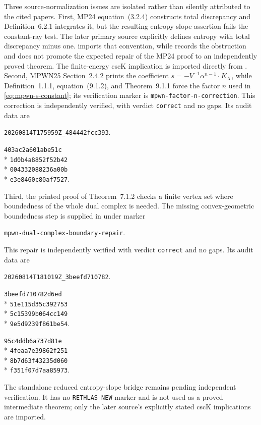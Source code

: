 Three source-normalization issues are isolated rather than silently
attributed to the cited papers.  First, MP24 equation~(3.2.4) constructs
total discrepancy and Definition~6.2.1 integrates it, but the resulting
entropy-slope assertion fails the constant-ray test.  The later primary
source \cite[Definition~2.4.1]{MPWN25} explicitly defines entropy with total
discrepancy minus one.   imports that convention,
while  records the obstruction and does not promote the
expected repair of the MP24 proof to an independently proved theorem.  The
finite-energy cscK implication is imported directly from
\cite[Theorem~2.4.3]{MPWN25}.  Second, MPWN25
Section~2.4.2 prints the coefficient
\(s=-V^{-1}\alpha^{n-1}\cdot K_X\), while Definition~1.1.1, equation~(9.1.2),
and Theorem~9.1.1 force the factor \(n\) used in
\eqref{eq:mpwn-s-constant}; its verification marker is
\texttt{mpwn-factor-n-correction}.  This correction is independently
verified, with verdict \texttt{correct} and no gaps.  Its audit data are
\begin{description}[style=nextline,leftmargin=1.5em,labelindent=0pt]
\item[Receipt]
\texttt{20260814T175959Z\_484442fcc393}.
\item[Proof digest]
\texttt{403ac2a601abe51c}\\*
\texttt{1d0b4a8852f52b42}\\*
\texttt{004332088236a00b}\\*
\texttt{e3e8460c80af7527}.
\end{description}
Third, the printed proof of
Theorem~7.1.2 checks a finite vertex set where boundedness of the whole dual
complex is needed.  The missing convex-geometric boundedness step is supplied
in  under marker
\par\nopagebreak
\noindent\texttt{mpwn-dual-complex-boundary-repair}.
\par\nopagebreak
\noindent This repair is independently
verified with verdict \texttt{correct} and no gaps.  Its audit data are
\begin{description}[style=nextline,leftmargin=1.5em,labelindent=0pt]
\item[Receipt]
\texttt{20260814T181019Z\_3beefd710782}.
\item[Statement digest]
\texttt{3beefd710782d6ed}\\*
\texttt{51e115d35c392753}\\*
\texttt{5c15399b064cc149}\\*
\texttt{9e5d9239f861be54}.
\item[Proof digest]
\texttt{95c4ddb6a737d81e}\\*
\texttt{4feaa7e39862f251}\\*
\texttt{8b7d63f43235d060}\\*
\texttt{f351f07d7aa85973}.
\end{description}
The standalone reduced entropy-slope bridge remains pending independent
verification.  It has no \texttt{RETHLAS-NEW} marker and is not used as a
proved intermediate theorem; only the later source's explicitly stated
cscK implications are imported.

